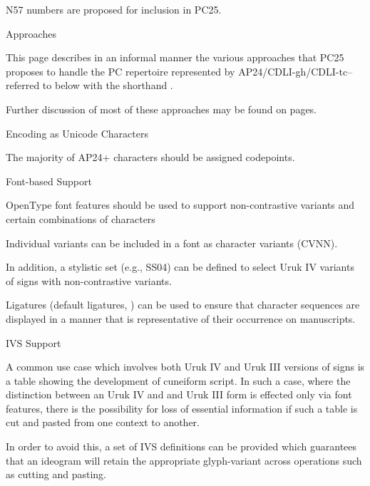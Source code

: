 \par N57 numbers are proposed for inclusion in PC25.

\Hh{}Approaches


\par This page describes in an informal manner the various
      approaches that PC25 proposes to handle the PC repertoire
      represented by AP24/CDLI-gh/CDLI-tc--referred to below with the
      shorthand .


\par Further discussion of most of these approaches may be found
      on  pages.

\Hhhh{}Encoding as Unicode Characters


\par The majority of AP24+ characters should be assigned codepoints.

\Hhhh{}Font-based Support


\par OpenType font features should be used to support
      non-contrastive variants and certain combinations of characters


\par Individual variants can be included in a font as character
      variants (CVNN).


\par In addition, a stylistic set (e.g., SS04) can
      be defined to select Uruk IV variants of signs with
      non-contrastive variants.


\par Ligatures (default ligatures, ) can be used
      to ensure that character sequences are displayed in a manner
      that is representative of their occurrence on manuscripts.

\Hhhh{}IVS Support


\par A common use case which involves both Uruk IV and Uruk III
      versions of signs is a table showing the development of
      cuneiform script.  In such a case, where the distinction between
      an Uruk IV and and Uruk III form is effected only via font
      features, there is the possibility for loss of essential
      information if such a table is cut and pasted from one context
      to another.


\par In order to avoid this, a set of IVS definitions can be
      provided which guarantees that an ideogram will retain the
      appropriate glyph-variant across operations such as cutting and
      pasting.

